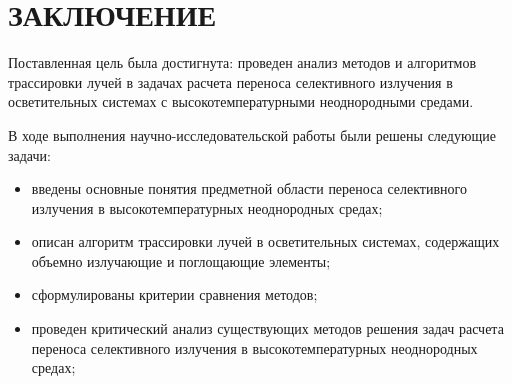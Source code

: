 \chapter*{\hfill ЗАКЛЮЧЕНИЕ \hfill}

Поставленная цель была достигнута: проведен анализ методов и алгоритмов трассировки лучей в задачах расчета переноса селективного излучения в осветительных системах с высокотемпературными неоднородными средами.

В ходе выполнения научно-исследовательской работы были решены следующие задачи:

\begin{itemize}[label=---]
	\item введены основные понятия предметной области переноса селективного излучения в высокотемпературных неоднородных средах;
\item описан алгоритм трассировки лучей в осветительных системах, содержащих объемно излучающие и поглощающие элементы;
\item сформулированы критерии сравнения методов;
\item проведен критический анализ существующих методов решения задач расчета переноса селективного излучения в высокотемпературных неоднородных средах;
\end{itemize}
